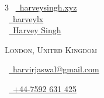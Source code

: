\documentclass[a4paper,10pt]{extarticle} %
\begin{document}
\pagestyle{empty} %


\begin{multicols}{3}
\normalsize \faGlobe\ {\href{https://www.harveysingh.xyz}{\ harveysingh.xyz}}\\
\normalsize \faGithub\ {\href{https://github.com/harveylx}{\ harveylx}}\\
\normalsize \faLinkedinSquare\ {\href{https://www.linkedin.com/in/harveysingh1}{\  Harvey Singh}}\\

\columnbreak

\par{\par} %
\par{\centering\normalsize {\textsc{London, United Kingdom}}\hfill\par}
\columnbreak
\raggedright\hfill\normalsize \faEnvelope\ {\href{mailto:harvirjaswal@gmail.com}{\  harvirjaswal@gmail.com}}\\
\raggedright\hfill\normalsize \faPhone\ {\href{tel:07592631425|}{\  +44-7592 631 425}}\\
\end{multicols}

\end{document}
